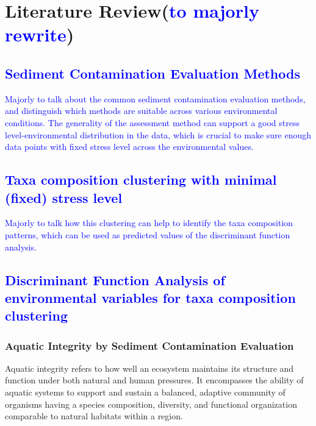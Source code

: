 \section{Literature Review(\textcolor{blue}{to majorly rewrite})}


\subsection{\textcolor{blue}{Sediment Contamination Evaluation Methods}}
\textcolor{blue}{Majorly to talk about the common sediment contamination evaluation methods,
and distinguish which methods are suitable across various environmental conditions.
The generality of the assessment method can support a good stress level-environmental distribution in the data,
which is crucial to make sure enough data points with fixed stress level across the environmental values.}

\subsection{\textcolor{blue}{Taxa composition clustering with minimal (fixed) stress level}}
\textcolor{blue}{Majorly to talk how this clustering can help to identify the taxa composition patterns,
which can be used as predicted values of the discriminant function analysis.}

\subsection{\textcolor{blue}{Discriminant Function Analysis of environmental variables for taxa composition clustering}}

\subsubsection{Aquatic Integrity by Sediment Contamination Evaluation}


Aquatic integrity refers to how well an ecosystem maintains its structure and function under both natural and human pressures.
 It encompasses the ability of aquatic systems to support and sustain a balanced, adaptive community of organisms having a species
  composition, diversity, and functional organization comparable to natural habitats within a region.

